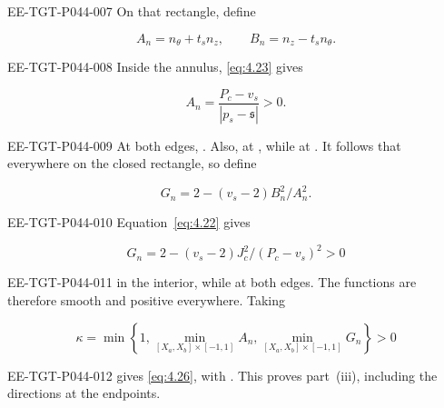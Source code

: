 \begin{EESegment}{EE-TGT-P044-007}
On that rectangle, define
\end{EESegment}
\[
A_n=n_\theta+t_sn_z,
\qquad B_n=n_z-t_sn_\theta.
\]
\begin{EESegment}{EE-TGT-P044-008}
Inside the annulus, \eqref{eq:4.23} gives
\end{EESegment}
\[
A_n=\frac{P_c-v_s}{|p_s-\mathfrak s|}>0.
\]
\begin{EESegment}{EE-TGT-P044-009}
At both edges, . Also,
 at , while
 at . It follows that
 everywhere on the closed rectangle, so define
\end{EESegment}
\[
G_n=2-(v_s-2)B_n^2/A_n^2.
\]
\begin{EESegment}{EE-TGT-P044-010}
Equation~\eqref{eq:4.22} gives
\end{EESegment}
\[
G_n=2-(v_s-2)J_c^2/(P_c-v_s)^2>0
\]
\begin{EESegment}{EE-TGT-P044-011}
in the interior, while  at both edges. The functions
 are therefore smooth and positive everywhere. Taking
\end{EESegment}
\[
\kappa=\min\left\{1,
\min_{[X_a,X_b]\times[-1,1]}A_n,
\min_{[X_a,X_b]\times[-1,1]}G_n\right\}>0
\]
\begin{EESegment}{EE-TGT-P044-012}
gives \eqref{eq:4.26}, with . This proves part~\textup{(iii)},
including the directions at the endpoints.
\end{EESegment}


